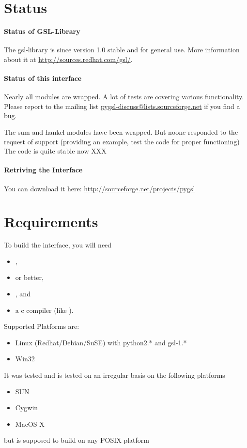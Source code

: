 \section{Status}

\paragraph*{Status of GSL-Library}
The gsl-library is since version 1.0 stable and for general use.
More information about it at \url{http://sources.redhat.com/gsl/}.

\paragraph*{Status of this interface}
Nearly all modules are wrapped. A lot of tests are
covering various functionality. Please report to the mailing list
\url{pygsl-discuss@lists.sourceforge.net} if you find a bug.

 The sum and hankel modules have been
wrapped. But noone responded to the request of support (providing an example,
test the code for proper functioning)
The code is quite stable now XXX 

\paragraph*{Retriving the Interface}
You can download it here: \url{http://sourceforge.net/projects/pygsl}

\section{Requirements}

To build the interface, you will need
\begin{itemize}
\item {},
\item {} or better,
\item {}, and
\item a c compiler (like ).
\end{itemize}

Supported Platforms are:
\begin{itemize}
\item Linux (Redhat/Debian/SuSE) with python2.* and gsl-1.*
\item Win32
\end{itemize}
It was tested and is tested on an irregular basis on the following platforms
\begin{itemize}
\item SUN
\item Cygwin
\item MacOS X
\end{itemize}
but is supposed to build on any POSIX platform

